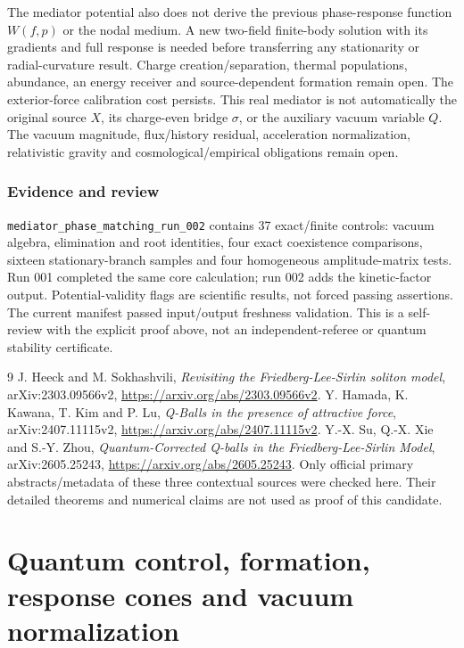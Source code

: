 \documentclass[11pt]{article}
\begin{document}
The mediator potential also does not derive the previous phase-response
function $W(f,p)$ or the nodal medium. A new two-field finite-body solution
with its gradients and full response is needed before transferring any
stationarity or radial-curvature result. Charge creation/separation,
thermal populations, abundance, an energy receiver and source-dependent
formation remain open. The exterior-force calibration cost persists.
This real mediator is not automatically the original source $X$, its
charge-even bridge $\sigma$, or the auxiliary vacuum variable $Q$.
The vacuum magnitude, flux/history residual, acceleration normalization,
relativistic gravity and cosmological/empirical obligations remain open.

\section{Evidence and review}
\texttt{mediator\_phase\_matching\_run\_002} contains 37 exact/finite
controls: vacuum algebra, elimination and root identities, four exact
coexistence comparisons, sixteen stationary-branch samples and four
homogeneous amplitude-matrix tests. Run 001 completed the same core
calculation; run 002 adds the kinetic-factor output. Potential-validity
flags are scientific results, not forced passing assertions. The current
manifest passed input/output freshness validation. This is a self-review
with the explicit proof above, not an independent-referee or quantum
stability certificate.

\begin{thebibliography}{9}
 J. Heeck and M. Sokhashvili,
\emph{Revisiting the Friedberg-Lee-Sirlin soliton model},
arXiv:2303.09566v2, \url{https://arxiv.org/abs/2303.09566v2}.
 Y. Hamada, K. Kawana, T. Kim and P. Lu,
\emph{Q-Balls in the presence of attractive force},
arXiv:2407.11115v2, \url{https://arxiv.org/abs/2407.11115v2}.
 Y.-X. Su, Q.-X. Xie and S.-Y. Zhou,
\emph{Quantum-Corrected Q-balls in the Friedberg-Lee-Sirlin Model},
arXiv:2605.25243, \url{https://arxiv.org/abs/2605.25243}.
Only official primary abstracts/metadata of these three contextual sources
were checked here. Their detailed theorems and numerical claims are not
used as proof of this candidate.
\end{thebibliography}

\clearpage

\part{Quantum control, formation, response cones and vacuum normalization}
\end{document}
